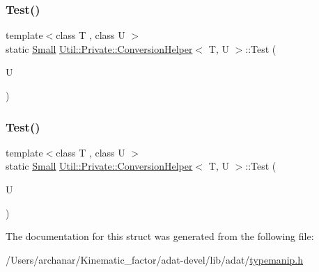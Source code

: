 \mbox{\label{structUtil_1_1Private_1_1ConversionHelper_aeee49a75a44a57a9fec054caca088db9}} 
\subsubsection{\texorpdfstring{Test()}{Test()}\hspace{0.1cm}{\footnotesize\ttfamily [5/6]}}
{\footnotesize\ttfamily template$<$class T , class U $>$ \\
static \mbox{\hyperlink{structUtil_1_1Private_1_1ConversionHelper_aaaf6583019b5246d4676b56923632385}{Small}} \mbox{\hyperlink{structUtil_1_1Private_1_1ConversionHelper}{Util\+::\+Private\+::\+Conversion\+Helper}}$<$ T, U $>$\+::Test (\begin{DoxyParamCaption}\item[{U}]{ }\end{DoxyParamCaption})\hspace{0.3cm}{\ttfamily [static]}}

\mbox{\label{structUtil_1_1Private_1_1ConversionHelper_aeee49a75a44a57a9fec054caca088db9}} 
\subsubsection{\texorpdfstring{Test()}{Test()}\hspace{0.1cm}{\footnotesize\ttfamily [6/6]}}
{\footnotesize\ttfamily template$<$class T , class U $>$ \\
static \mbox{\hyperlink{structUtil_1_1Private_1_1ConversionHelper_aaaf6583019b5246d4676b56923632385}{Small}} \mbox{\hyperlink{structUtil_1_1Private_1_1ConversionHelper}{Util\+::\+Private\+::\+Conversion\+Helper}}$<$ T, U $>$\+::Test (\begin{DoxyParamCaption}\item[{U}]{ }\end{DoxyParamCaption})\hspace{0.3cm}{\ttfamily [static]}}



The documentation for this struct was generated from the following file\+:\begin{DoxyCompactItemize}
\item 
/\+Users/archanar/\+Kinematic\+\_\+factor/adat-\/devel/lib/adat/\mbox{\hyperlink{adat-devel_2lib_2adat_2typemanip_8h}{typemanip.\+h}}\end{DoxyCompactItemize}
